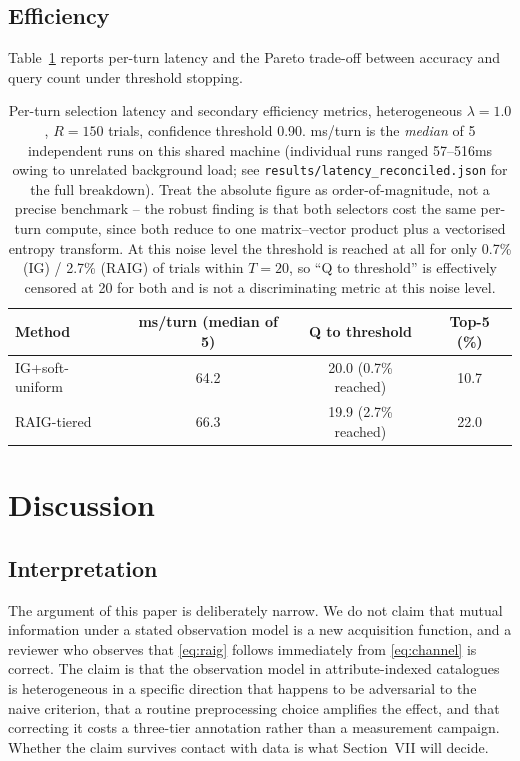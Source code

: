 \documentclass[conference]{IEEEtran}
\begin{document}
\subsection{Efficiency}

Table~\ref{tab:latency} reports per-turn latency and the Pareto trade-off
between accuracy and query count under threshold stopping.

\begin{table}[t]
\caption{Per-turn selection latency and secondary efficiency metrics,
heterogeneous $\lambda=1.0$, $R=150$ trials, confidence threshold 0.90.
ms/turn is the \emph{median} of 5 independent runs on this shared machine
(individual runs ranged 57--516ms owing to unrelated background load; see
\texttt{results/latency\_reconciled.json} for the full breakdown). Treat the
absolute figure as order-of-magnitude, not a precise benchmark -- the robust
finding is that both selectors cost the same per-turn compute, since both
reduce to one matrix--vector product plus a vectorised entropy transform. At
this noise level the threshold is reached at all for only 0.7\% (IG) / 2.7\%
(RAIG) of trials within $T=20$, so ``Q to threshold'' is effectively censored
at 20 for both and is not a discriminating metric at this noise level.}
\label{tab:latency}
\centering
\footnotesize
\begin{tabular}{@{}lccc@{}}
\toprule
\textbf{Method} & \textbf{ms/turn (median of 5)} & \textbf{Q to threshold} & \textbf{Top-5 (\%)} \\
\midrule
IG+soft-uniform & 64.2 & 20.0 (0.7\% reached) & 10.7 \\
RAIG-tiered & 66.3 & 19.9 (2.7\% reached) & 22.0 \\
\bottomrule
\end{tabular}
\end{table}

\section{Discussion}

\subsection{Interpretation}

The argument of this paper is deliberately narrow. We do not claim that mutual
information under a stated observation model is a new acquisition function, and
a reviewer who observes that \eqref{eq:raig} follows immediately from
\eqref{eq:channel} is correct. The claim is that the observation model in
attribute-indexed catalogues is heterogeneous in a specific direction that
happens to be adversarial to the naive criterion, that a routine preprocessing
choice amplifies the effect, and that correcting it costs a three-tier
annotation rather than a measurement campaign. Whether the claim survives
contact with data is what Section~VII will decide.
\end{document}
